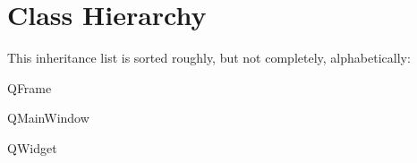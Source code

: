 \section{Class Hierarchy}
This inheritance list is sorted roughly, but not completely, alphabetically\+:\begin{DoxyCompactList}
\item {}
\item Q\+Frame\begin{DoxyCompactList}
\item {}
\item {}
\end{DoxyCompactList}
\item Q\+Main\+Window\begin{DoxyCompactList}
\item {}
\end{DoxyCompactList}
\item Q\+Widget\begin{DoxyCompactList}
\item {}
\end{DoxyCompactList}
\item {}
\item {}
\end{DoxyCompactList}
